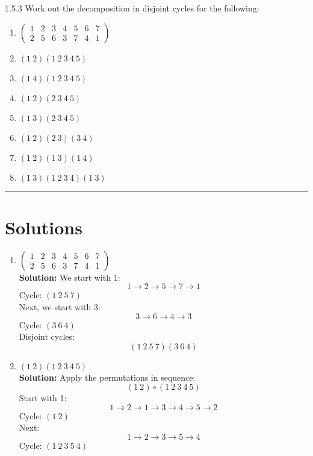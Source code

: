 \documentclass[12pt]{amsart}
\theoremstyle{definition}
\numberwithin{equation}{section}
\begin{document}
\begin{exercise}{1.5.3} Work out the decomposition in disjoint cycles for the following:
            \begin{enumerate}[label=(\alph*)]
                \item \(
                      \begin{pmatrix}
                        1 & 2 & 3 & 4 & 5 & 6 & 7\\
                        2 & 5 & 6 & 3 & 7 & 4 & 1
                      \end{pmatrix}
                    \)
                \item \( (1 \ 2)(1\ 2 \ 3 \ 4 \ 5)\)
                \item \((1 \ 4)(1\ 2 \ 3 \ 4 \ 5)\)
                \item \((1 \ 2)(2 \ 3 \ 4 \ 5)\)
                \item \((1 \ 3)(2 \ 3 \ 4 \ 5)\)
                \item \((1 \ 2)(2 \ 3)(3 \ 4)\)
                \item \((1 \ 2)(1 \ 3)(1 \ 4)\)
                \item \((1 \ 3)(1 \ 2 \ 3 \ 4)(1 \ 3)\)
            \end{enumerate}
            \noindent\rule{\linewidth}{1pt}
        
        \section*{Solutions}
        
        \begin{enumerate}[label=(\alph*)]
            \item \(
                  \begin{pmatrix}
                    1 & 2 & 3 & 4 & 5 & 6 & 7\\
                    2 & 5 & 6 & 3 & 7 & 4 & 1
                  \end{pmatrix}
                \)\\
            \textbf{Solution:} We start with 1: 
            \[ 1 \to 2 \to 5 \to 7 \to 1 \]
            Cycle: \( (1 \ 2 \ 5 \ 7) \)\\
            Next, we start with 3:
            \[ 3 \to 6 \to 4 \to 3 \]
            Cycle: \( (3 \ 6 \ 4) \)\\
            Disjoint cycles: 
            \[
            (1 \ 2 \ 5 \ 7)(3 \ 6 \ 4)
            \]
        
            \item \( (1 \ 2)(1 \ 2 \ 3 \ 4 \ 5) \)\\
            \textbf{Solution:} Apply the permutations in sequence:
            \[ (1 \ 2) \circ (1 \ 2 \ 3 \ 4 \ 5) \]
            Start with 1:
            \[ 1 \to 2 \to 1 \to 3 \to 4 \to 5 \to 2 \]
            Cycle: \( (1 \ 2) \)\\
            Next:
            \[ 1 \to 2 \to 3 \to 5 \to 4 \]
            Cycle: \( (1 \ 2 \ 3 \ 5 \ 4) \)
        

\end{enumerate}
\end{exercise}
\end{document}
